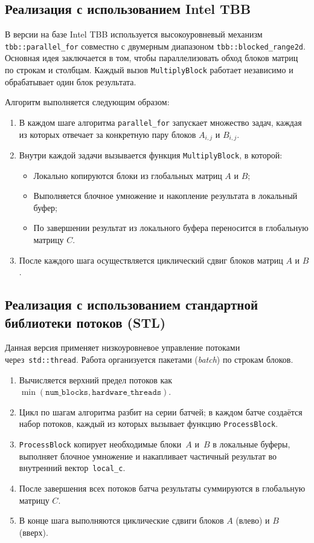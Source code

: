 \documentclass[12pt]{article}
\begin{document}
\subsection*{Реализация с использованием Intel TBB}

В версии на базе Intel TBB используется высокоуровневый механизм \texttt{tbb::parallel\_for} совместно с двумерным диапазоном \texttt{tbb::blocked\_range2d}. Основная идея заключается в том, чтобы параллелизовать обход блоков матриц по строкам и столбцам. Каждый вызов \texttt{MultiplyBlock} работает независимо и обрабатывает один блок результата.

Алгоритм выполняется следующим образом:

\begin{enumerate}
    \item В каждом шаге алгоритма \texttt{parallel\_for} запускает множество задач, каждая из которых отвечает за конкретную пару блоков \( A_{i,j} \) и \( B_{i,j} \).
    \item Внутри каждой задачи вызывается функция \texttt{MultiplyBlock}, в которой:
    \begin{itemize}
        \item Локально копируются блоки из глобальных матриц \( A \) и \( B \);
        \item Выполняется блочное умножение и накопление результата в локальный буфер;
        \item По завершении результат из локального буфера переносится в глобальную матрицу \( C \).
    \end{itemize}
    \item После каждого шага осуществляется циклический сдвиг блоков матриц \( A \) и \( B \).
\end{enumerate}
\subsection*{Реализация с использованием стандартной библиотеки потоков (STL)}

Данная версия применяет низкоуровневое управление потоками через~\texttt{std::thread}.  
Работа организуется пакетами (\emph{batch}) по строкам блоков.

\begin{enumerate}
    \item Вычисляется верхний предел потоков как \(\min(\texttt{num\_blocks}, \texttt{hardware\_threads})\).
    \item Цикл по шагам алгоритма разбит на серии батчей; в каждом батче создаётся набор потоков, каждый из которых вызывает функцию \texttt{ProcessBlock}.
    \item \texttt{ProcessBlock} копирует необходимые блоки~\(A\) и~\(B\) в локальные буферы, выполняет блочное умножение и накапливает частичный результат во внутренний вектор~\texttt{local\_c}.
    \item После завершения всех потоков батча результаты суммируются в глобальную матрицу \(C\).
    \item В конце шага выполняются циклические сдвиги блоков \(A\) (влево) и \(B\) (вверх).
\end{enumerate}
\end{document}
